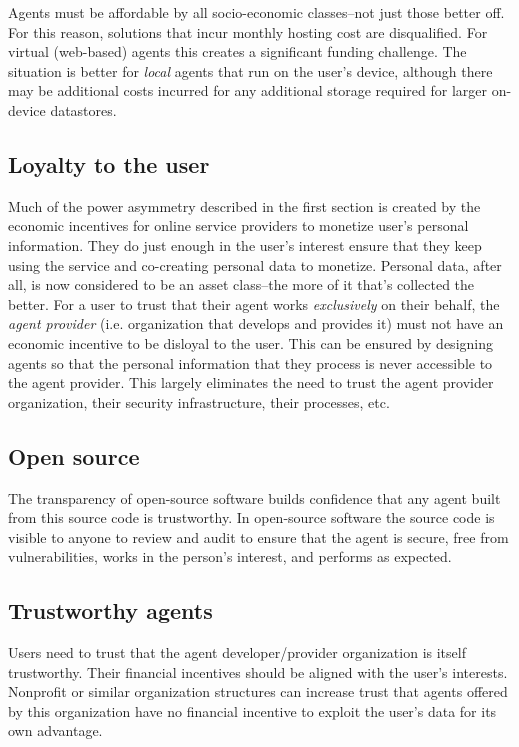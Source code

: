 \documentclass[11pt, oneside]{article}   	%
\begin{document}
Agents must be affordable by all socio-economic classes--not just those better off. For this reason, solutions that incur monthly hosting cost are disqualified. For virtual (web-based) agents this creates a significant funding challenge. The situation is better for \emph{local} agents that run on the user's device, although there may be additional costs incurred for any additional storage required for larger on-device datastores.


\subsection{Loyalty to the user}
Much of the power asymmetry described in the first section is created by the economic incentives for online service providers to monetize user's personal information. They do just enough in the user's interest ensure that they keep using the service and co-creating personal data to monetize. Personal data, after all, is now considered to be an asset class--the more of it that's collected the better. For a user to trust that their agent works \emph{exclusively} on their behalf, the \emph{agent provider} (i.e. organization that develops and provides it) must not have an economic incentive to be disloyal to the user. This can be ensured by designing agents so that the personal information that they process is never accessible to the agent provider. This largely eliminates the need to trust the agent provider organization, their security infrastructure, their processes, etc.

\subsection{Open source}

The transparency of open-source software builds confidence that any agent built from this source code is trustworthy. In open-source software the source code is visible to anyone to review and audit to ensure that the agent is secure, free from vulnerabilities, works in the person's interest, and performs as expected.

\subsection{Trustworthy agents}

Users need to trust that the agent developer/provider organization is itself trustworthy. Their financial incentives should be aligned with the user's interests. Nonprofit or similar organization structures can increase trust that agents offered by this organization have no financial incentive to exploit the user's data for its own advantage. 
\end{document}
